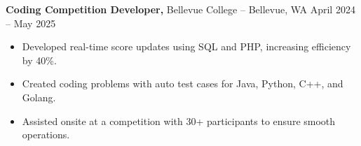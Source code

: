 \documentclass[11pt]{article}       %
\begin{document}

\textbf{Coding Competition Developer,} {Bellevue College} -- Bellevue, WA \hfill April 2024 -- May 2025 \\
\vspace{-9pt}
\begin{itemize}
  \item Developed real-time score updates using SQL and PHP, increasing efficiency by 40\%.
  \item Created coding problems with auto test cases for Java, Python, C++, and Golang.
  \item Assisted onsite at a competition with 30+ participants to ensure smooth operations.
\end{itemize}

\end{document}
